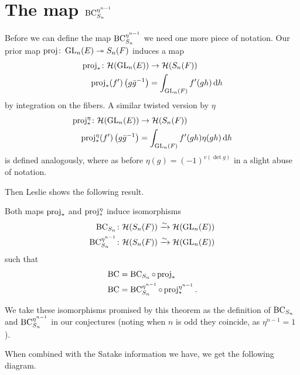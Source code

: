 \section{The map $\operatorname{BC}^{\eta^{n-1}}_{S_n}$}
Before we can define the map $\operatorname{BC}^{\eta^{n-1}}_{S_n}$
we need one more piece of notation.
Our prior map $\operatorname{proj} \colon \operatorname{GL}_n(E) \twoheadrightarrow S_n(F)$ induces a map
\begin{align*}
  \rproj_\ast \colon \HH(\GL_n(E)) &\to \HH(S_n(F)) \\
  \rproj_\ast(f')\left( g\bar{g}\inv \right) &= \int_{\GL_n(F)} f'(gh) \odif h
\end{align*}
by integration on the fibers.
A similar twisted version by $\eta$
\begin{align*}
  \rproj_\ast^\eta \colon \HH(\GL_n(E)) &\to \HH(S_n(F)) \\
  \rproj_\ast^\eta(f')\left( g\bar{g}\inv \right) &= \int_{\GL_n(F)} f'(gh) \eta(gh) \odif h
\end{align*}
is defined analogously,
where as before $\eta(g) = (-1)^{v(\det g)}$ in a slight abuse of notation.

Then Leslie \cite{ref:leslie} shows the following result.
\begin{theorem}
  Both maps $\operatorname{proj}_\ast$ and $\operatorname{proj}_\ast^\eta$ induce isomorphisms
  \begin{align*}
    \operatorname{BC}_{S_n} \colon \mathcal H(S_n(F)) &\xrightarrow{\sim} \mathcal H(\operatorname{GL}_n(E)) \\
    \operatorname{BC}^{\eta^{n-1}}_{S_n} \colon \mathcal H(S_n(F)) &\xrightarrow{\sim} \mathcal H(\operatorname{GL}_n(E))
  \end{align*}
  such that
  \begin{align*}
    \operatorname{BC} &= \operatorname{BC}_{S_n} \circ \operatorname{proj}_\ast \\
    \operatorname{BC} &= \operatorname{BC}^{\eta^{n-1}}_{S_n} \circ \operatorname{proj}_\ast^{\eta^{n-1}}.
  \end{align*}
\end{theorem}
We take these isomorphisms promised by this theorem
as the definition of $\operatorname{BC}_{S_n}$ and $\operatorname{BC}^{\eta^{n-1}}_{S_n}$ in our conjectures
(noting when $n$ is odd they coincide, as $\eta^{n-1} = 1$).

When combined with the Satake information we have, we get the following diagram.
\begin{center}
\end{center}

